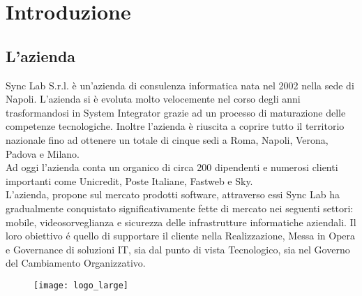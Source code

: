 
\chapter{Introduzione}
\label{cap:introduzione}





\section{L'azienda}

Sync Lab S.r.l. è un'azienda di consulenza informatica nata nel 2002 nella sede di Napoli. L'azienda si è evoluta molto velocemente nel corso degli anni trasformandosi in System Integrator grazie ad un processo di maturazione delle competenze tecnologiche. Inoltre l'azienda è riuscita a coprire tutto il territorio nazionale fino ad ottenere un totale di cinque sedi a Roma, Napoli, Verona, Padova e Milano.\\
Ad oggi l'azienda conta un organico di circa 200 dipendenti e numerosi clienti importanti come Unicredit, Poste Italiane, Fastweb e Sky. \\
L'azienda, propone sul mercato prodotti software, attraverso essi Sync Lab ha gradualmente conquistato significativamente fette di mercato nei seguenti settori: mobile, videosorveglianza e sicurezza delle infrastrutture informatiche aziendali.
Il loro obiettivo é quello di supportare il cliente nella Realizzazione, Messa in Opera e Governance di soluzioni IT, sia dal punto di vista Tecnologico, sia nel Governo del Cambiamento Organizzativo.
\begin{figure}[h]
	\begin{center}
		\texttt{[image: logo\_large]}
	\end{center}
\end{figure}

